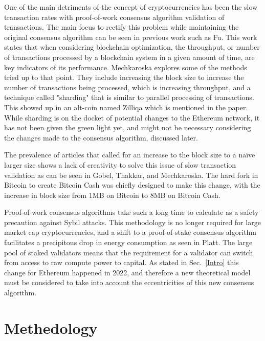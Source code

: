 \documentclass[conference]{IEEEtran}
\begin{document}
One of the main detriments of the concept of cryptocurrencies has been the slow transaction
rates with proof-of-work consensus algorithm validation of transactions. The main focus to rectify 
this problem while maintaining the original consensus algorithm can be seen in previous work such 
as Fu\cite{2020_IEEEToVT_Fu}. This work states that when considering blockchain optimization, 
the throughput, or number of transactions processed by a blockchain system in a given amount of 
time, are key indicators of its performance. Mechkaroska\cite{2018_TELFOR_Mechkaroska} explores
some of the methods tried up to that point. They include increasing the block size to increase the 
number of transactions being processed, which is increasing throughput, and a technique called 
"sharding" that is similar to parallel processing of transactions. This showed up in an alt-coin named 
Zilliqa\cite{2017_Zilliqa_Zilliqa} which is mentioned in the paper. While sharding is on the docket of 
potential changes to the Ethereum network, it has not been given the green light yet, and might not
be necessary considering the changes made to the consensus algorithm, discussed later.

The prevalence of articles that called for an increase to the block size to a na\"ive larger size shows 
a lack of creativity to solve this issue of slow transaction validation as can be seen in Gobel, Thakkar, 
and Mechkaroska\cite{2017_IEEE_Gobel, 2018_IEEE_Thakkar, 2018_TELFOR_Mechkaroska}. The 
hard fork in Bitcoin to create Bitcoin Cash was chiefly designed to make this change, with the increase 
in block size from 1MB on Bitcoin to 8MB on Bitcoin Cash. 

Proof-of-work consensus algorithms take such a long time to calculate as a safety precaution against
Sybil attacks. This methodology is no longer required for large market cap cryptocurrencies, and a 
shift to a proof-of-stake consensus algorithm facilitates a precipitous drop in energy consumption
as seen in Platt\cite{2021_IEEEQRSC_Platt}. The large pool of staked validators means that the 
requirement for a validator can switch from access to raw compute power to capital. As stated in 
Sec.~\ref{Intro} this change for Ethereum happened in 2022, and therefore a new theoretical model
must be considered to take into account the eccentricities of this new consensus algorithm. 

\section{Methedology}
\end{document}
